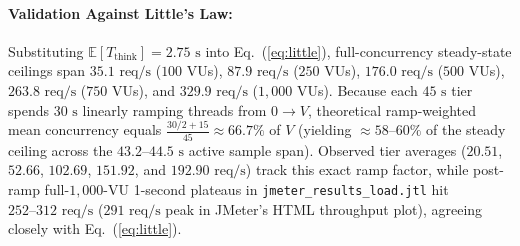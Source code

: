 \documentclass[11pt,letterpaper]{article}
\begin{document}
\paragraph{Validation Against Little's Law:} Substituting $\mathbb{E}[T_{\text{think}}] = 2.75\text{ s}$ into Eq.~(\ref{eq:little}), full-concurrency steady-state ceilings span $35.1\text{ req/s}$ ($100$ VUs), $87.9\text{ req/s}$ ($250$ VUs), $176.0\text{ req/s}$ ($500$ VUs), $263.8\text{ req/s}$ ($750$ VUs), and $329.9\text{ req/s}$ ($1{,}000$ VUs). Because each $45\text{ s}$ tier spends $30\text{ s}$ linearly ramping threads from $0\to V$, theoretical ramp-weighted mean concurrency equals $\frac{30/2 + 15}{45} \approx 66.7\%$ of $V$ (yielding $\approx 58\text{--}60\%$ of the steady ceiling across the $43.2\text{--}44.5\text{ s}$ active sample span). Observed tier averages ($20.51$, $52.66$, $102.69$, $151.92$, and $192.90\text{ req/s}$) track this exact ramp factor, while post-ramp full-$1{,}000$-VU 1-second plateaus in \texttt{jmeter\_results\_load.jtl} hit \textbf{$252\text{--}312\text{ req/s}$} ($291\text{ req/s}$ peak in JMeter's HTML throughput plot), agreeing closely with Eq.~(\ref{eq:little}).
\end{document}
